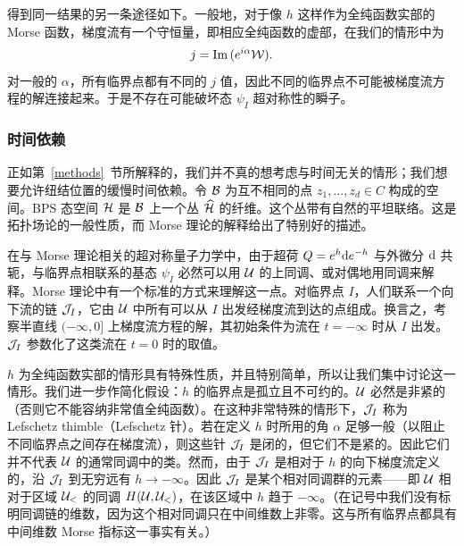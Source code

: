 得到同一结果的另一条途径如下。一般地，对于像 $h$ 这样作为全纯函数实部的 Morse 函数，梯度流有一个守恒量，即相应全纯函数的虚部，在我们的情形中为
\begin{equation}\label{conserved}  j = \mathrm{Im}\,(e^{i\alpha}{\mathcal W}). \end{equation}
对一般的 $\alpha$，所有临界点都有不同的 $j$ 值，因此不同的临界点不可能被梯度流方程的解连接起来。于是不存在可能破坏态 $\psi_I$ 超对称性的瞬子。

\subsubsection{时间依赖}\label{time}

正如第~\ref{methods}~节所解释的，我们并不真的想考虑与时间无关的情形；我们想要允许纽结位置的缓慢时间依赖。令 $\mathcal{B}$ 为互不相同的点 $z_1,\dots,z_d\in C$ 构成的空间。BPS 态空间 ${\mathcal H}$ 是 $\mathcal{B}$ 上一个丛 $\widehat{{\mathcal H}}$ 的纤维。这个丛带有自然的平坦联络。这是拓扑场论的一般性质，而 Morse 理论的解释给出了特别好的描述。

在与 Morse 理论相关的超对称量子力学中，由于超荷 $Q=e^h{\mathrm d} e^{-h}$ 与外微分 ${\mathrm d}$ 共轭，与临界点相联系的基态 $\psi_I$ 必然可以用 ${\mathcal U}$ 的上同调、或对偶地用同调来解释。Morse 理论中有一个标准的方式来理解这一点。对临界点 $I$，人们联系一个向下流的链 ${\mathcal J}_I$，它由 ${\mathcal U}$ 中所有可以从 $I$ 出发经梯度流到达的点组成。换言之，考察半直线 $(-\infty,0]$ 上梯度流方程的解，其初始条件为流在 $t=-\infty$ 时从 $I$ 出发。${\mathcal J}_I$ 参数化了这类流在 $t=0$ 时的取值。

$h$ 为全纯函数实部的情形具有特殊性质，并且特别简单，所以让我们集中讨论这一情形。我们进一步作简化假设：$h$ 的临界点是孤立且不可约的。${\mathcal U}$ 必然是非紧的（否则它不能容纳非常值全纯函数）。在这种非常特殊的情形下，${\mathcal J}_I$ 称为 Lefschetz thimble（Lefschetz 针）。若在定义 $h$ 时所用的角 $\alpha$ 足够一般（以阻止不同临界点之间存在梯度流），则这些针 ${\mathcal J}_I$ 是闭的，但它们不是紧的。因此它们并不代表 ${\mathcal U}$ 的通常同调中的类。然而，由于 ${\mathcal J}_I$ 是相对于 $h$ 的向下梯度流定义的，沿 ${\mathcal J}_I$ 到无穷远有 $h\to -\infty$。因此 ${\mathcal J}_I$ 是某个相对同调群的元素——即 ${\mathcal U}$ 相对于区域 ${\mathcal U}_<$ 的同调 $H({\mathcal U},{\mathcal U}_<)$，在该区域中 $h$ 趋于 $-\infty$。（在记号中我们没有标明同调链的维数，因为这个相对同调只在中间维数上非零。这与所有临界点都具有中间维数 Morse 指标这一事实有关。）

